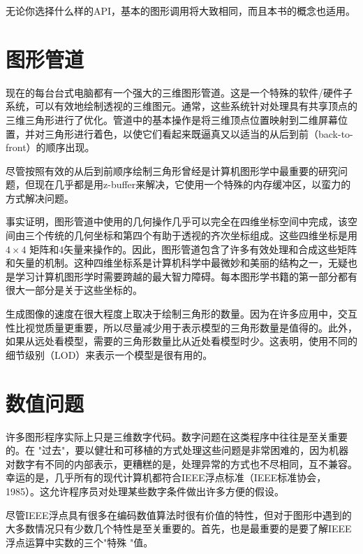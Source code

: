 \documentclass[lang=cn,10pt]{elegantbook}
\begin{document}
无论你选择什么样的API，基本的图形调用将大致相同，而且本书的概念也适用。

\section{图形管道}

现在的每台台式电脑都有一个强大的三维图形管道。这是一个特殊的软件/硬件子系统，可以有效地绘制透视的三维图元。通常，这些系统针对处理具有共享顶点的三维三角形进行了优化。管道中的基本操作是将三维顶点位置映射到二维屏幕位置，并对三角形进行着色，以使它们看起来既逼真又以适当的从后到前（back-to-front）的顺序出现。

尽管按照有效的从后到前顺序绘制三角形曾经是计算机图形学中最重要的研究问题，但现在几乎都是用z-buffer来解决，它使用一个特殊的内存缓冲区，以蛮力的方式解决问题。

事实证明，图形管道中使用的几何操作几乎可以完全在四维坐标空间中完成，该空间由三个传统的几何坐标和第四个有助于透视的齐次坐标组成。这些四维坐标是用 $4 \times 4$ 矩阵和4矢量来操作的。因此，图形管道包含了许多有效处理和合成这些矩阵和矢量的机制。这种四维坐标系是计算机科学中最微妙和美丽的结构之一，无疑也是学习计算机图形学时需要跨越的最大智力障碍。每本图形学书籍的第一部分都有很大一部分是关于这些坐标的。

生成图像的速度在很大程度上取决于绘制三角形的数量。因为在许多应用中，交互性比视觉质量更重要，所以尽量减少用于表示模型的三角形数量是值得的。此外，如果从远处看模型，需要的三角形数量比从近处看模型时少。这表明，使用不同的细节级别（LOD）来表示一个模型是很有用的。

\section{数值问题}

许多图形程序实际上只是三维数字代码。数字问题在这类程序中往往是至关重要的。在 "过去"，要以健壮和可移植的方式处理这些问题是非常困难的，因为机器对数字有不同的内部表示，更糟糕的是，处理异常的方式也不尽相同，互不兼容。幸运的是，几乎所有的现代计算机都符合IEEE浮点标准（IEEE标准协会，1985）。这允许程序员对处理某些数字条件做出许多方便的假设。


尽管IEEE浮点具有很多在编码数值算法时很有价值的特性，但对于图形中遇到的大多数情况只有少数几个特性是至关重要的。首先，也是最重要的是要了解IEEE浮点运算中实数的三个"特殊 "值。
\end{document}
